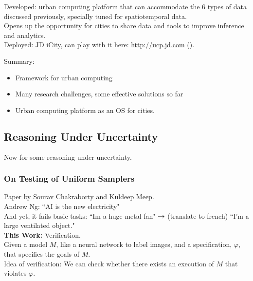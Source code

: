 Developed: urban computing platform that can accommodate the 6 types of data discussed previously, specially tuned for spatiotemporal data. \\

Opens up the opportunity for cities to share data and tools to improve inference and analytics. \\

Deployed: JD iCity, can play with it here: \url{http://ucp.jd.com} ().

Summary:
\begin{itemize}
    \item Framework for urban computing
    \item Many research challenges, some effective solutions so far
    \item Urban computing platform as an OS for cities.
\end{itemize}

\spacerule

\subsection{Reasoning Under Uncertainty}

Now for some reasoning under uncertainty.


\subsubsection{On Testing of Uniform Samplers~\cite{chakraborty2019testing}}

Paper by Sourav Chakraborty and Kuldeep Meep. \\

Andrew Ng: ``AI is the new electricity" \\

And yet, it fails basic tasks: ``Im a huge metal fan" $\rightarrow$ (translate to french) ``I'm a large ventilated object." \\

{\bf This Work:} Verification. \\

Given a model $M$, like a neural network to label images, and a specification, $\varphi$, that specifies the goals of $M$. \\

Idea of verification: We can check whether there exists an execution of $M$ that violates $\varphi$.\\

